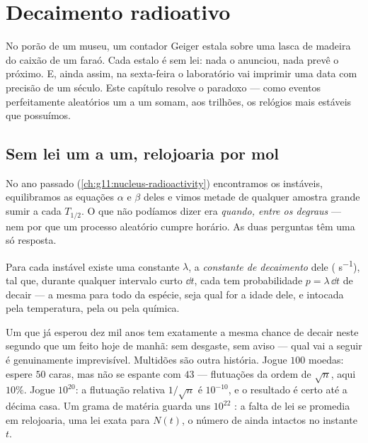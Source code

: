 \chapter{Decaimento radioativo}\label{ch:g12:radioactive-decay}

No porão de um museu, um contador Geiger estala sobre uma lasca de madeira do caixão de
um faraó. Cada estalo é sem lei: nada o anunciou, nada prevê o próximo. E, ainda assim,
na sexta-feira o laboratório vai imprimir uma data com precisão de um século. Este
capítulo resolve o paradoxo --- como eventos perfeitamente aleatórios um a um somam, aos
trilhões, os relógios mais estáveis que possuímos.

\section{Sem lei um a um, relojoaria por mol}

No ano passado (\cref{ch:g11:nucleus-radioactivity}) encontramos os  instáveis,
equilibramos as equações $\alpha$ e $\beta$ deles e vimos metade de qualquer amostra
grande sumir a cada  $T_{1/2}$. O que não podíamos dizer era \emph{quando,
entre os degraus} --- nem por que um processo aleatório cumpre horário. As duas
perguntas têm uma só resposta.

\begin{definition}\label{def:g12:radioactive-decay:lambda}
Para cada  instável existe uma constante $\lambda$, a \emph{constante de
decaimento} dele ( \unit{s^{-1}}), tal que,
durante qualquer intervalo curto $\dd t$, cada  tem probabilidade
$p = \lambda\,\dd t$ de decair --- a mesma para todo  da espécie, seja qual for a
idade dele, e intocada pela temperatura, pela  ou pela química.
\end{definition}

\begin{remark}\label{rem:g12:radioactive-decay:crowds}
Um  que já esperou dez mil anos tem exatamente a mesma chance de decair neste
segundo que um feito hoje de manhã: sem desgaste, sem aviso --- qual vai a seguir é
genuinamente imprevisível. Multidões são outra história. Jogue $100$ moedas: espere $50$
caras, mas não se espante com $43$ --- flutuações da ordem de $\sqrt n$, aqui $10\%$.
Jogue $10^{20}$: a flutuação relativa $1/\sqrt n$ é $10^{-10}$, e o resultado é certo
até a décima casa. Um grama de matéria guarda uns $10^{22}$ : a falta de lei se
promedia em relojoaria, uma lei exata para $N(t)$, o número de  ainda intactos no
instante $t$.
\end{remark}

